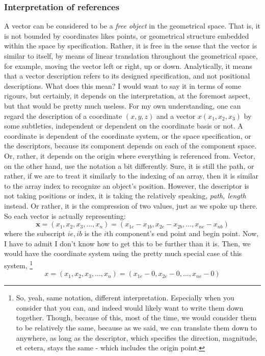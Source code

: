 \subsubsection{Interpretation of references}
A vector can be considered to be a \textit{free object} in the geometrical space. That is, it is not bounded by coordinates likes points, or geometrical structure embedded within the space by specification. Rather, it is free in the sense that the vector is similar to itself, by means of linear translation throughout the geometrical space, for example, moving the vector left or right, up or down. Analytically, it means that a vector description refers to its designed specification, and not positional descriptions. What does this mean? I would want to say it in terms of some rigours, but certainly, it depends on the interpretation, at the foremost aspect, but that would be pretty much useless. For my own understanding, one can regard the description of a coordinate $(x,y,z)$ and a vector $x(x_1, x_2, x_3)$ by some subtleties, independent or dependent on the coordinate basis or not. A coordinate is dependent of the coordinate system, or the space specification, or the descriptors, because its component depends on each of the component space. Or, rather, it depends on the origin where everything is referenced from. Vector, on the other hand, use the notation a bit differently. Sure, it is still the path, or rather, if we are to treat it similarly to the indexing of an array, then it is similar to the array index to recognize an object's position. However, the descriptor is not taking positions or index, it is taking the relatively speaking, \textit{path, length} instead. Or rather, it is the compression of two values, just as we spoke up there. So each vector is actually representing: 
\begin{equation}
    \mathbf{x} = (x_{1},x_{2},x_{3},\dots,x_{n}) = (x_{1e}- x_{1b}, x_{2e}- x_{2b},\dots, x_{ne}- x_{nb}) 
\end{equation}
where the subscript $ie, ib$ is the $i$th component's end point and begin point. Now, I have to admit I don't know how to get this to be further than it is. Then, we would have the coordinate system using the pretty much special case of this system, \footnote{So, yeah, same notation, different interpretation. Especially when you consider that you can, and indeed would likely want to write them down together. Though, because of this, most of the time, we would consider them to be relatively the same, because as we said, we can translate them down to anywhere, as long as the descriptor, which specifies the direction, magnitude, et cetera, stays the same - which includes the origin point. }
\begin{equation}
    x = (x_{1},x_{2},x_{3},\dots,x_{n}) = (x_{1e}- 0, x_{2e}- 0,\dots, x_{ne}- 0) 
\end{equation}

